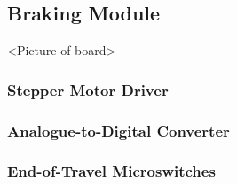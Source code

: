 \subsection{Braking Module}

<Picture of board>


\subsubsection{Stepper Motor Driver}


\subsubsection{Analogue-to-Digital Converter}


\subsubsection{End-of-Travel Microswitches}